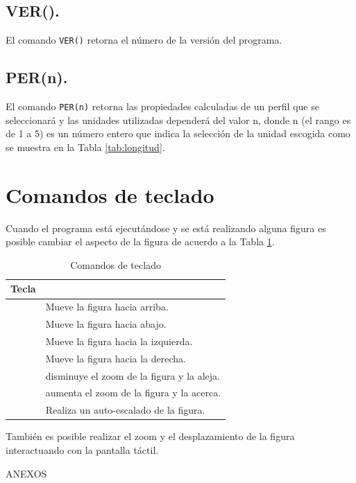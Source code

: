 \documentclass[spanish,xcolor=pdftex,dvipsnames,table,mathserif]{scrartcl}
\begin{document}
\subsection{VER().}
El comando \verb|VER()| retorna el número de la versión del programa.

\subsection{PER(n).}
El comando \verb|PER(n)| retorna las propiedades calculadas de un perfil que se seleccionará y las unidades utilizadas dependerá del valor n, donde n (el rango es de 1 a 5) es un número entero que indica la selección de la unidad escogida como se muestra en la Tabla \ref{tab:longitud}.

\section{Comandos de teclado}
Cuando el programa está ejecutándose y se está realizando alguna figura es posible cambiar el aspecto de la figura de acuerdo a la Tabla \ref{tab:teclado}.
\begin{table}[H]
	\caption{Comandos de teclado}
	\label{tab:teclado}
	\begin{tabular}{>{\centering}m{2cm}>{\raggedright}m{14cm}}
		\toprule 
		\textbf{Tecla} & \multicolumn{1}{c}{\textbf{Descripción}} \tabularnewline
		\midrule 
		\hpup
		& Mueve la figura hacia arriba.\tabularnewline
		\cmidrule(lr){1-2}
		\hpdown &Mueve la figura hacia abajo. \tabularnewline
		\cmidrule(lr){1-2}
		\hpleft&Mueve la figura hacia la izquierda. \tabularnewline
		\cmidrule(lr){1-2}
		\hpright&Mueve la figura hacia la derecha. \tabularnewline
		\cmidrule(lr){1-2}
		\hpminus& disminuye el zoom de la figura y la aleja.\tabularnewline
		\cmidrule(lr){1-2}
		\hpplus&  aumenta el zoom de la figura y la acerca. \tabularnewline
		\cmidrule(lr){1-2}
		\hpesc& Realiza un auto-escalado de la figura. \tabularnewline
		\bottomrule
	\end{tabular}
\end{table}  
 También es posible realizar el zoom y el desplazamiento de la figura interactuando con la pantalla táctil. 
\newpage
\appendix
\pagebreak
\hspace{0pt}
\vfill
\begin{center}
	\Huge ANEXOS
\end{center}
\vfill
\hspace{0pt}
\pagebreak
{}	%
\renewcommand*{\thesection}{\arabic{section}}
\end{document}
